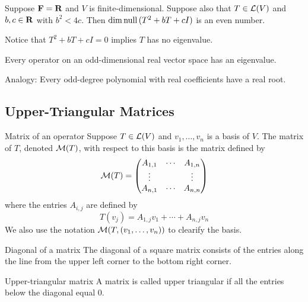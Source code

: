 \documentclass[12pt,a4paper]{article}
\begin{document}
    \begin{prop}
        Suppose $\mathbf{F}=\mathbf{R}$ and $V$ is finite-dimensional. Suppose also that $T\in\mathcal{L}(V)$ and $b,c\in\mathbf{R}$ with $b^2<4c$. Then $\dim\operatorname{null\,}(T^2+bT+cI)$ is an even number.
    \end{prop}
    \begin{remark}
        Notice that $T^2+bT+cI=0$ implies $T$ has no eigenvalue.
    \end{remark}
    \hfill

    \begin{prop}
        Every operator on an odd-dimensional real vector space has an eigenvalue.
    \end{prop}
    \begin{remark}
        Analogy: Every odd-degree polynomial with real coefficients have a real root.
    \end{remark}
    
    \subsection{Upper-Triangular Matrices}
    \begin{defi}{Matrix of an operator}%
    Suppose $T\in\mathcal{L}(V)$ and $v_1,\dots,v_n$ is a basis of $V$. The matrix of $T$, denoted $\mathcal{M}(T)$, with respect to this basis is the  matrix defined by
    $$
    \mathcal{M}(T)=\begin{pmatrix}
        A_{1,1} & \cdots & A_{1,n}\\
        \vdots & & \vdots\\
        A_{n,1} & \cdots & A_{n,n}\\
    \end{pmatrix}
    $$
    where the entries $A_{i,j}$ are defined by
    $$
    T(v_j)=A_{1,j}v_1+\cdots+A_{n,j}v_n
    $$
    We also use the notation $\mathcal{M}(T,(v_1,\dots,v_n))$ to clearify the basis.
    \end{defi}
    \hfill

    \begin{defi}{Diagonal of a matrix}
        The diagonal of a square matrix consists of the entries along the line from the upper left corner to the bottom right corner.
    \end{defi}
    \begin{defi}{Upper-triangular matrix}
        A matrix is called upper triangular if all the entries below the diagonal equal $0$.
    \end{defi}
    \hfill
\end{document}
